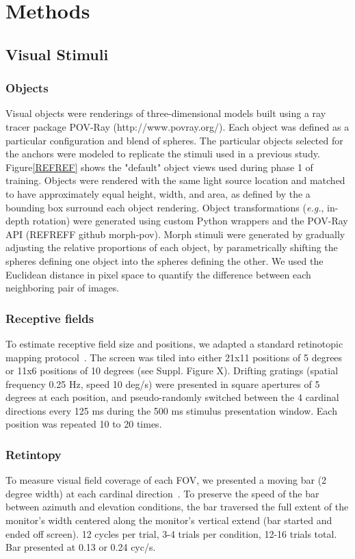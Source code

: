 \chapter{Methods}
\label{methods}


\section{Visual Stimuli}
\subsection{Objects}
Visual objects were renderings of three-dimensional models built using a ray tracer package POV-Ray (http://www.povray.org/). Each object was defined as a particular configuration and blend of spheres. The particular objects selected for the anchors were modeled to replicate the stimuli used in a previous study\cite{Zoccolan2009}. Figure\ref{REFREF} shows the "default" object views used during phase 1 of training. Objects were rendered with the same light source location and matched to have approximately equal height, width, and area, as defined by the a bounding box surround each object rendering. Object transformations (\textit{e.g.}, in-depth rotation) were generated using custom Python wrappers and the POV-Ray API (REFREFF github morph-pov). 
Morph stimuli were generated by gradually adjusting the relative proportions of each object, by parametrically shifting the spheres defining one object into the spheres defining the other. We used the Euclidean distance in pixel space to quantify the difference between each neighboring pair of images. 

\subsection{Receptive fields}
To estimate receptive field size and positions, we adapted a standard retinotopic mapping protocol~\cite{petreanuRF}. The screen was tiled into either 21x11 positions of 5 degrees or 11x6 positions of 10 degrees (see Suppl. Figure X). Drifting gratings (spatial frequency 0.25 Hz, speed 10 deg/s) were presented in square apertures of 5 degrees at each position, and pseudo-randomly switched between the 4 cardinal directions every 125 ms during the 500 ms stimulus presentation window. Each position was repeated 10 to 20 times. 

\subsection{Retintopy}
To measure visual field coverage of each FOV, we presented a moving bar (2 degree width) at each cardinal direction~\cite{kalatsky2009}. To preserve the speed of the bar between azimuth and elevation conditions, the bar traversed the full extent of the monitor's width centered along the monitor's vertical extend (bar started and ended off screen). 12 cycles per trial, 3-4 trials per condition, 12-16 trials total. Bar presented at 0.13 or 0.24 cyc/s.


